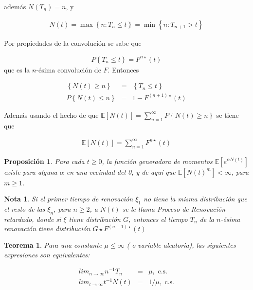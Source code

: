 \documentclass{article}
\newtheorem{Teo}{Teorema}[section]
\newtheorem{Note}{Nota}[section]
\newtheorem{Prop}{Proposición}[section]
\newcommand{\esp}{\mathbb{E}}
\numberwithin{equation}{section}
\begin{document}
adem\'as $N\left(T_{n}\right)=n$, y 

\begin{eqnarray*}
N\left(t\right)=\max\left\{n:T_{n}\leq t\right\}=\min\left\{n:T_{n+1}>t\right\}
\end{eqnarray*}

Por propiedades de la convoluci\'on se sabe que

\begin{eqnarray*}
P\left\{T_{n}\leq t\right\}=F^{n\star}\left(t\right)
\end{eqnarray*}
que es la $n$-\'esima convoluci\'on de $F$. Entonces 

\begin{eqnarray*}
\left\{N\left(t\right)\geq n\right\}&=&\left\{T_{n}\leq t\right\}\\
P\left\{N\left(t\right)\leq n\right\}&=&1-F^{\left(n+1\right)\star}\left(t\right)
\end{eqnarray*}

Adem\'as usando el hecho de que $\esp\left[N\left(t\right)\right]=\sum_{n=1}^{\infty}P\left\{N\left(t\right)\geq n\right\}$
se tiene que

\begin{eqnarray*}
\esp\left[N\left(t\right)\right]=\sum_{n=1}^{\infty}F^{n\star}\left(t\right)
\end{eqnarray*}

\begin{Prop}
Para cada $t\geq0$, la funci\'on generadora de momentos $\esp\left[e^{\alpha N\left(t\right)}\right]$ existe para alguna $\alpha$ en una vecindad del 0, y de aqu\'i que $\esp\left[N\left(t\right)^{m}\right]<\infty$, para $m\geq1$.
\end{Prop}


\begin{Note}
Si el primer tiempo de renovaci\'on $\xi_{1}$ no tiene la misma distribuci\'on que el resto de las $\xi_{n}$, para $n\geq2$, a $N\left(t\right)$ se le llama Proceso de Renovaci\'on retardado, donde si $\xi$ tiene distribuci\'on $G$, entonces el tiempo $T_{n}$ de la $n$-\'esima renovaci\'on tiene distribuci\'on $G\star F^{\left(n-1\right)\star}\left(t\right)$
\end{Note}


\begin{Teo}
Para una constante $\mu\leq\infty$ ( o variable aleatoria), las siguientes expresiones son equivalentes:

\begin{eqnarray}
lim_{n\rightarrow\infty}n^{-1}T_{n}&=&\mu,\textrm{ c.s.}\\
lim_{t\rightarrow\infty}t^{-1}N\left(t\right)&=&1/\mu,\textrm{ c.s.}
\end{eqnarray}
\end{Teo}
\end{document}
